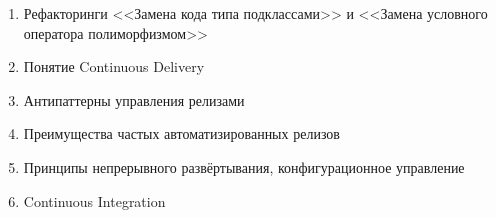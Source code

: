 \documentclass[a5paper]{article}
\begin{document}
\begin{enumerate}
    \item Рефакторинги <<Замена кода типа подклассами>> и <<Замена условного оператора полиморфизмом>>
    \item Понятие Continuous Delivery
    \item Антипаттерны управления релизами
    \item Преимущества частых автоматизированных релизов
    \item Принципы непрерывного развёртывания, конфигурационное управление
    \item Continuous Integration
\end{enumerate}
\end{document}
